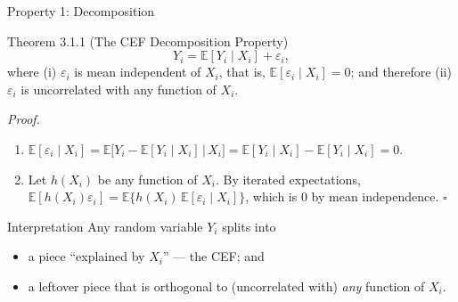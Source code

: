 \documentclass[aspectratio=169,11pt]{beamer}
\newcommand{\E}{\mathbb{E}}
\newcommand{\PrfLbl}{\textcolor{DeepBlue}{\textit{Proof.}}\ }
\newcommand{\QED}{\hfill$\square$}
\begin{document}
\begin{frame}{Property 1: Decomposition}
\small

\begin{block}{Theorem 3.1.1 (The CEF Decomposition Property)}
\[
Y_i = \E[Y_i\mid X_i] + \varepsilon_i,
\]
where (i) $\varepsilon_i$ is mean independent of $X_i$, that is,
$\E[\varepsilon_i\mid X_i]=0$; and therefore (ii) $\varepsilon_i$ is
uncorrelated with any function of $X_i$.
\end{block}

\medskip

\PrfLbl
\begin{enumerate}
    \item[(i)] $\E[\varepsilon_i\mid X_i]
    = \E\big[Y_i-\E[Y_i\mid X_i]\,\big|\,X_i\big]
    = \E[Y_i\mid X_i]-\E[Y_i\mid X_i] = 0.$
    \item[(ii)] Let $h(X_i)$ be any function of $X_i$. By iterated
    expectations,
    $\E[h(X_i)\varepsilon_i] = \E\{h(X_i)\,\E[\varepsilon_i\mid X_i]\}$,
    which is $0$ by mean independence. \QED
\end{enumerate}

\medskip

\begin{block}{Interpretation}
Any random variable $Y_i$ splits into
\begin{itemize}
    \item a piece ``explained by $X_i$'' --- the CEF; and
    \item a leftover piece that is orthogonal to (uncorrelated with)
    \emph{any} function of $X_i$.
\end{itemize}
\end{block}

\end{frame}
\end{document}
